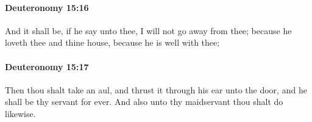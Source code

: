 		\paragraph{Deuteronomy 15:16} %
			\label{DEUTERONOMY-15-16}

			And it shall be, if he say unto thee, I will not go away from thee; because he loveth thee and thine house, because he is well with thee;


		\paragraph{Deuteronomy 15:17} %
			\label{DEUTERONOMY-15-17}

			Then thou shalt take an aul, and thrust it through his ear unto the door, and he shall be thy servant for ever. And also unto thy maidservant thou shalt do likewise.



